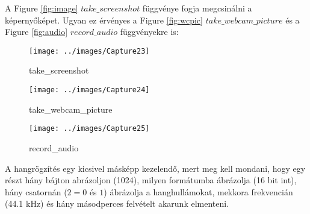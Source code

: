 \documentclass[a4paper, 11pt]{article}
\begin{document}
A Figure \ref{fig:image} $take\_screenshot$ függvénye fogja megcsinálni a képernyőképet. Ugyan ez érvényes a Figure \ref{fig:wcpic} $take\_webcam\_picture$ és a Figure \ref{fig:audio} $record\_audio$ függvényekre is:
\begin{figure}[H]
\centering
\texttt{[image: ../images/Capture23]}
\caption{take\_screenshot}
\label{fig:takeimage}
\end{figure}

\begin{figure}[H]
\centering
\texttt{[image: ../images/Capture24]}
\caption{take\_webcam\_picture}
\label{fig:takewcpic}
\end{figure}

\begin{figure}[H]
\centering
\texttt{[image: ../images/Capture25]}
\caption{record\_audio}
\label{fig:recordaud}
\end{figure}
A hangrögzítés egy kicsivel másképp kezelendő, mert meg kell mondani, hogy egy részt hány bájton abrázoljon (1024), milyen formátumba ábrázolja (16 bit int), hány csatornán ($2 = 0$ és $1$) ábrázolja a hanghullámokat, mekkora frekvencián (44.1 kHz) és hány másodperces felvételt akarunk elmenteni.
\end{document}
